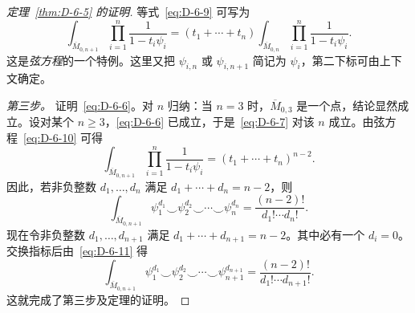 \begin{proof}[定理~\ref{thm:D-6-5} 的证明]
等式~\eqref{eq:D-6-9} 可写为
\begin{equation}\label{eq:D-6-10}
  \int_{\overline M_{0,n+1}}\prod_{i=1}^{n}\frac{1}{1-t_i\psi_i}
  =(t_1+\cdots+t_n)
    \int_{\overline M_{0,n}}\prod_{i=1}^{n}\frac{1}{1-t_i\psi_i}.
\end{equation}
这是\emph{弦方程}的一个特例。这里又把 $\psi_{i,n}$ 或 $\psi_{i,n+1}$ 简记为 $\psi_i$，第二下标可由上下文确定。

\emph{第三步。} 证明~\eqref{eq:D-6-6}。对 $n$ 归纳：当 $n=3$ 时，$\overline M_{0,3}$ 是一个点，结论显然成立。设对某个 $n\ge3$，\eqref{eq:D-6-6} 已成立，于是~\eqref{eq:D-6-7} 对该 $n$ 成立。由弦方程~\eqref{eq:D-6-10} 可得
\[
  \int_{\overline M_{0,n+1}}\prod_{i=1}^{n}\frac{1}{1-t_i\psi_i}
  =(t_1+\cdots+t_n)^{n-2}.
\]
因此，若非负整数 $d_1,\ldots,d_n$ 满足 $d_1+\cdots+d_n=n-2$，则
\begin{equation}\label{eq:D-6-11}
  \int_{\overline M_{0,n+1}}
    \psi_1^{d_1}\smile\psi_2^{d_2}\smile\cdots\smile\psi_n^{d_n}
  =\frac{(n-2)!}{d_1!\cdots d_n!}.
\end{equation}
现在令非负整数 $d_1,\ldots,d_{n+1}$ 满足 $d_1+\cdots+d_{n+1}=n-2$。其中必有一个 $d_i=0$。交换指标后由~\eqref{eq:D-6-11} 得
\begin{equation}\label{eq:D-6-12}
  \int_{\overline M_{0,n+1}}
    \psi_1^{d_1}\smile\psi_2^{d_2}\smile\cdots\smile\psi_{n+1}^{d_{n+1}}
  =\frac{(n-2)!}{d_1!\cdots d_{n+1}!}.
\end{equation}
这就完成了第三步及定理的证明。
\end{proof}
